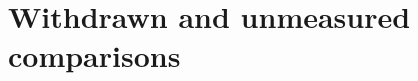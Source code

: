 \section{Withdrawn and unmeasured comparisons}
\begin{table}[htbp]
\centering
\caption{Withdrawn and unmeasured comparisons. These entries are scope dispositions, not zero-effect measurements.}
\label{tab:withdrawn-comparisons}

\end{table}
\clearpage

\clearpage
\label{paper:checklist-start}


